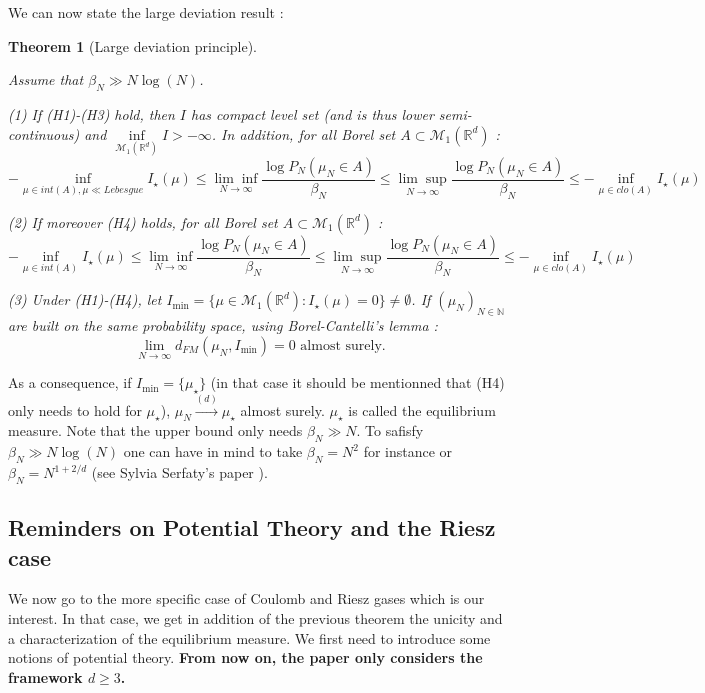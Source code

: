 \documentclass[a4paper,12pt]{report}
\newtheorem{thm}{Theorem}
\begin{document}
We can now state the large deviation result :

\begin{thm}[Large deviation principle]\label{cgz:ldp}

    Assume that $\beta_{N} \gg N\log(N)$.
    
    (1) If (H1)-(H3) hold, then $I$ has compact level set (and is thus lower semi-continuous) and $\underset{\mathcal{M}_{1}(\mathbb{R}^{d})}{\inf} I > - \infty$. In addition, for all Borel set $A \subset \mathcal{M}_{1}(\mathbb{R}^{d})$ : 
    \[-\underset{\mu \in int(A), \mu \ll Lebesgue}{\inf} I_{\star}(\mu) \leq \underset{N \longrightarrow\infty}{\lim \inf} \frac{\log P_{N}(\mu_{N} \in A)}{\beta_{N}}\leq \underset{N \longrightarrow\infty}{\lim \sup} \frac{\log P_{N}(\mu_{N} \in A)}{\beta_{N}} \leq -\underset{\mu \in clo(A)}{\inf} I_{\star}(\mu)\]
    
    (2) If moreover (H4) holds, for all Borel set $A \subset \mathcal{M}_{1}(\mathbb{R}^{d})$ : 
    \[-\underset{\mu \in int(A)}{\inf} I_{\star}(\mu) \leq \underset{N \longrightarrow\infty}{\lim \inf} \frac{\log P_{N}(\mu_{N} \in A)}{\beta_{N}}\leq \underset{N \longrightarrow\infty}{\lim \sup} \frac{\log P_{N}(\mu_{N} \in A)}{\beta_{N}} \leq -\underset{\mu \in clo(A)}{\inf} I_{\star}(\mu)\]
    
    (3) Under (H1)-(H4), let $I_{\min} = \{\mu \in \mathcal{M}_{1}(\mathbb{R}^{d}) : I_{\star}(\mu) = 0\} \neq \emptyset$. If $(\mu_{N})_{N \in \mathbb{N}}$ are built on the same probability space, using Borel-Cantelli's lemma :
    \[\underset{N \longrightarrow \infty}{\lim} d_{FM}(\mu_{N}, I_{\min}) = 0 \text{  almost surely.}\]
\end{thm}

As a consequence, if $I_{\min} = \{\mu_{\star}\}$ (in that case it should be mentionned that (H4) only needs to hold for $\mu_{\star}$), $\mu_{N} \overset{(d)}{\longrightarrow} \mu_{\star}$ almost surely. $\mu_{\star}$ is called the equilibrium measure. Note that the upper bound only needs $\beta_{N} \gg N$. To safisfy $\beta_{N} \gg N\log(N)$ one can have in mind to take $\beta_{N} = N^{2}$ for instance or $\beta_{N} = N^{1+2/d}$ (see Sylvia Serfaty's paper \cite{serfaty2020}).


\subsection{Reminders on Potential Theory and the Riesz case}

We now go to the more specific case of Coulomb and Riesz gases which is our interest. In that case, we get in addition of the previous theorem the unicity and a characterization of the equilibrium measure. We first need to introduce some notions of potential theory. \textbf{From now on, the paper only considers the framework $d \geq 3$.}
\end{document}
